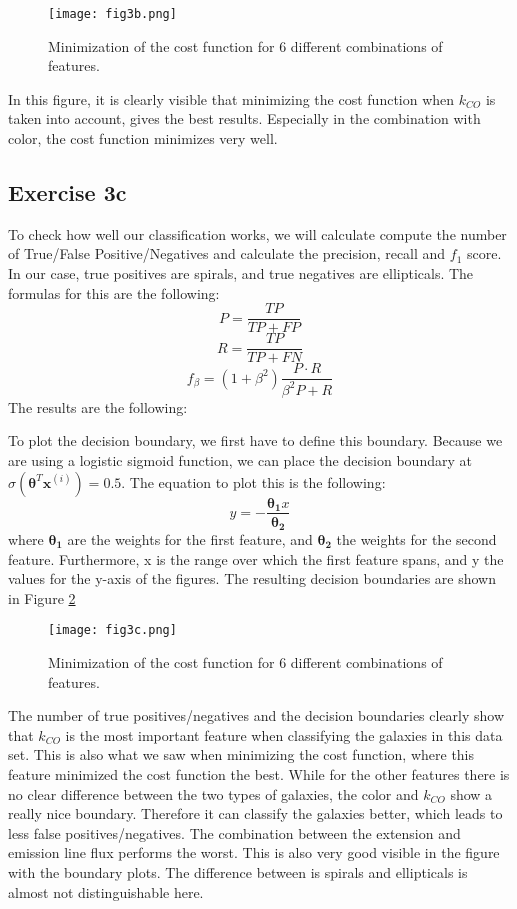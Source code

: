 \begin{figure}[h!]
  \centering
  \texttt{[image: fig3b.png]}
  \caption{Minimization of the cost function for 6 different combinations of features.}
  \label{fig:3b}
\end{figure}
In this figure, it is clearly visible that minimizing the cost function when $k_{CO}$ is taken into account, gives the best results. Especially in the combination with color, the cost function minimizes very well. 

\subsection{Exercise 3c}
To check how well our classification works, we will calculate compute the number of True/False Positive/Negatives and calculate the precision, recall and $f_1$ score. In our case, true positives are spirals, and true negatives are ellipticals. The formulas for this are the following: 
\begin{equation}
    P = \frac{TP}{TP + FP}
\end{equation}
\begin{equation}
    R = \frac{TP}{TP + FN}
\end{equation}
\begin{equation}
    f_{\beta} = (1+\beta^2)\frac{P \cdot R}{\beta^2P + R}
\end{equation}
The results are the following: 

To plot the decision boundary, we first have to define this boundary. Because we are using a logistic sigmoid function, we can place the decision boundary at $\sigma (\boldsymbol{\theta}^T \mathbf{x}^{(i)}) = 0.5$. The equation to plot this is the following: 
\begin{equation}
    y = -\frac{\boldsymbol{\theta_1}x}{\boldsymbol{\theta_2}}
\end{equation}
where $\boldsymbol{\theta_1}$ are the weights for the first feature, and $\boldsymbol{\theta_2}$ the weights for the second feature. Furthermore, x is the range over which the first feature spans, and y the values for the y-axis of the figures. The resulting decision boundaries are shown in Figure \ref{fig:3c}
\begin{figure}[h!]
  \centering
  \texttt{[image: fig3c.png]}
  \caption{Minimization of the cost function for 6 different combinations of features.}
  \label{fig:3c}
\end{figure}
The number of true positives/negatives and the decision boundaries clearly show that $k_{CO}$ is the most important feature when classifying the galaxies in this data set. This is also what we saw when minimizing the cost function, where this feature minimized the cost function the best. While for the other features there is no clear difference between the two types of galaxies, the color and $k_{CO}$ show a really nice boundary. Therefore it can classify the galaxies better, which leads to less false positives/negatives. The combination between the extension and emission line flux performs the worst. This is also very good visible in the figure with the boundary plots. The difference between is spirals and ellipticals is almost not distinguishable here. 